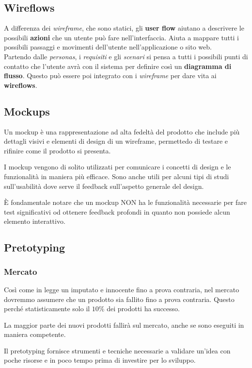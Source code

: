 \subsection{Wireflows}
A differenza dei \textit{wireframe}, che sono statici, gli \textbf{user flow} aiutano a descrivere le possibili \textbf{azioni} che un utente può fare nell'interfaccia. Aiuta a mappare tutti i possibili passaggi e movimenti dell'utente nell'applicazione o sito web.\\
Partendo dalle \textit{personas}, i \textit{requisiti} e gli \textit{scenari} si pensa a tutti i possibili punti di contatto che l'utente avrà con il sistema per definire così un \textbf{diagramma di flusso}. Questo può essere poi integrato con i \textit{wireframe} per dare vita ai \textbf{wireflows}.

\subsection{Mockups}
\begin{definition}[Mockup]
	Un mockup è una rappresentazione ad alta fedeltà del prodotto che include più dettagli visivi e elementi di design di un wireframe, permettedo di testare e rifinire come il prodotto si presenta.
\end{definition}
I mockup vengono di solito utilizzati per comunicare i concetti di design e le funzionalità in maniera più efficace. Sono anche utili per alcuni tipi di studi sull'usabilità dove serve il feedback sull'aspetto generale del design.

\begin{note}
	È fondamentale notare che un mockup NON ha le funzionalità necessarie per fare test significativi od ottenere feedback profondi in quanto non possiede alcun elemento interattivo.
\end{note}

\subsection{Pretotyping}
\subsubsection{Mercato}
Così come in legge un imputato e innocente fino a prova contraria, nel mercato dovremmo assumere che un prodotto sia fallito fino a prova contraria. Questo perché statisticamente solo il $10\%$ dei prodotti ha successo.
\begin{definition}
	La maggior parte dei nuovi prodotti fallirà sul mercato, anche se sono eseguiti in maniera competente.
\end{definition}
Il pretotyping fornisce strumenti e tecniche necessarie a validare un'idea con poche risorse e in poco tempo prima di investire per lo sviluppo.\\

